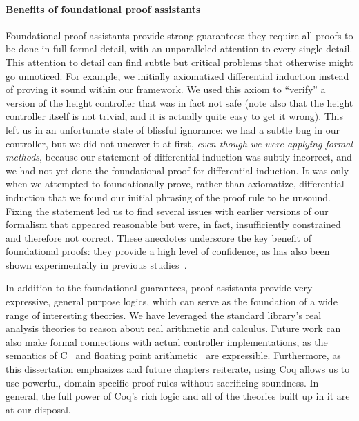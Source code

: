 \paragraph*{Benefits of foundational proof assistants}
\label{sec:proof-assistant}

Foundational proof assistants provide strong guarantees: they require all
proofs to be done in full formal detail, with an unparalleled attention to
every single detail.  This attention to detail can find subtle but critical
problems that otherwise might go unnoticed.  For example, we initially
axiomatized differential induction instead of proving it sound within our
framework.  We used this axiom to ``verify'' a version of the height
controller that was in fact not safe (note also that the height controller
itself is not trivial, and it is actually quite easy to get it wrong).
This left us in an unfortunate state of blissful ignorance: we had a subtle
bug in our controller, but we did not uncover it at first, \emph{even
  though we were applying formal methods}, because our statement of
differential induction was subtly incorrect, and we had not yet done the
foundational proof for differential induction.  It was only when we
attempted to foundationally prove, rather than axiomatize, differential
induction that we found our initial phrasing of the proof rule to be
unsound.  Fixing the statement led us to find several issues with earlier
versions of our formalism that appeared reasonable but were, in fact,
insufficiently constrained and therefore not correct.  These anecdotes
underscore the key benefit of foundational proofs: they provide a high
level of confidence, as has also been shown experimentally in previous
studies~\cite{yang2011understanding-compiler-bugs}.

In addition to the foundational guarantees, proof assistants provide very
expressive, general purpose logics, which can serve as the foundation of a
wide range of interesting theories.  We have leveraged the standard
library's real analysis theories to reason about real arithmetic and
calculus.  Future work can also make formal connections with actual
controller implementations, as the semantics of C~\cite{leroy2009compcert}
and floating point arithmetic~\cite{flocq11} are expressible. Furthermore,
as this dissertation emphasizes and future chapters reiterate, using Coq
allows us to use powerful, domain specific proof rules without sacrificing
soundness. In general, the full power of Coq's rich logic and all of the
theories built up in it are at our disposal.

